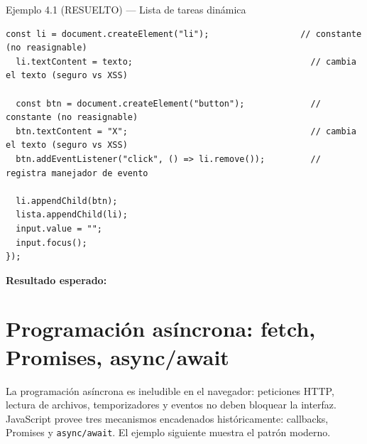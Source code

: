 \documentclass[11pt,a4paper,openany]{book}
\begin{document}
\begin{cajaejemplo}{Ejemplo 4.1 (RESUELTO) --- Lista de tareas dinámica}
\begin{lstlisting}[style=js,caption={tareas.js},label=lst:4.5]
  const li = document.createElement("li");                  // constante (no reasignable)
  li.textContent = texto;                                   // cambia el texto (seguro vs XSS)

  const btn = document.createElement("button");             // constante (no reasignable)
  btn.textContent = "X";                                    // cambia el texto (seguro vs XSS)
  btn.addEventListener("click", () => li.remove());         // registra manejador de evento

  li.appendChild(btn);
  lista.appendChild(li);
  input.value = "";
  input.focus();
});
\end{lstlisting}

\textbf{Resultado esperado:}

\end{cajaejemplo}

\section{Programación asíncrona: fetch, Promises, async/await}

La programación asíncrona es ineludible en el navegador:
peticiones HTTP, lectura de archivos, temporizadores y eventos no
deben bloquear la interfaz. JavaScript provee tres mecanismos
encadenados históricamente: callbacks, Promises y \texttt{async/await}.
El ejemplo siguiente muestra el patrón moderno.
\end{document}
